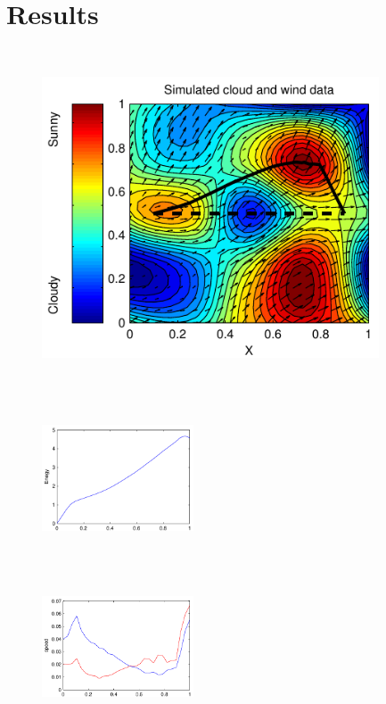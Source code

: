\section{Results}
\begin{figure}
\begin{minipage}[c][11cm][t]{0.5\textwidth}
  \vspace*{\fill}
  \centering
  \includegraphics[width=10cm,height=10cm]{../src/plot/fancy/path2}
  \label{fig:test1}
\end{minipage}%
\begin{minipage}[c][11cm][t]{.5\textwidth}
  \vspace*{\fill}
  \centering
  \includegraphics[width=4.5cm,height=4.5cm]{../src/plot/fancy/Energy}
  \label{fig:test2}\par\vfill
  \includegraphics[width=4.5cm,height=4.5cm]{../src/plot/fancy/speed}

\end{minipage}
\end{figure}
